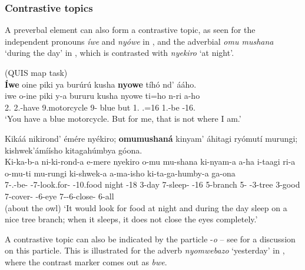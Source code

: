 \documentclass[output=paper]{langscibook}
\begin{document}
\z

\subsubsection{Contrastive topics}
\label{bkm:Ref111448990}
A preverbal element can also form a contrastive topic, as seen for the independent pronouns \textit{íwe} and \textit{nyówe} in , and the adverbial \textit{omu mushana} ‘during the day’ in , which is contrasted with \textit{nyekiro} ‘at night’.

\ea
\label{bkm:Ref111452864}
(QUIS map task)\\
\textbf{Íwe} oine piki ya burúrú kusha \textbf{nyowe} tíhó nd’ ááho.\\
\gll
iwe  o-ine  piki  y-a  bururu  kusha  nyowe  ti=ho  n-ri  a-ho\\
2\SG{}.\PRO{}  2\SG{}.\SM{}-have  9.motorcycle  9-\CONN{}  blue  but  1\SG{}.\PRO{}  \NEG{}.\COP{}=16  1\SG{}.\SM{}-be  \DEM{}-16.\PROX{}\\
\glt
‘You have a blue motorcycle. But for me, that is not where I am.’\\


\z

\ea
\label{bkm:Ref111452876}
Kikáá nikirond’ émére nyékiro; \textbf{omumushaná} kinyam’ áhitagi ryómutí murungi; kishwek’ámíísho kitagahúmbya góona.\\
\gll
  Ki-ka-b-a  ni-ki-rond-a  e-mere  nyekiro  o-mu  mu-shana    ki-nyam-a  a-ha  i-taagi   ri-a  o-mu-ti  mu-rungi  ki-shwek-a    a-ma-isho  ki-ta-ga-humby-a  ga-ona\\
7\SM{}-\F{}.\PST{}-be-\FV{}  \IPFV{}-7\SM{}-look.for-\FV{}  \AUG{}-10.food  night  \AUG{}-18  3-day  7\SM{}-sleep-\FV{}  \AUG{}-16  5-branch  5-\CONN{}  \AUG{}-3-tree  3-good  7\SM{}-cover-\FV{}    \AUG{}-6-eye  7\SM{}-\NEG{}-6\OM{}-close-\FV{}  6-all\\
\glt
  (about the owl) ‘It would look for food at night and during the day sleep on a nice tree branch; when it sleeps, it does not close the eyes completely.’\\


\z


A contrastive topic can also be indicated by the particle -\textit{o} – see  for a discussion on this particle. This is illustrated for the adverb \textit{nyomwebazo} ‘yesterday’ in , where the contrast marker comes out as \textit{bwe}.
\end{document}
